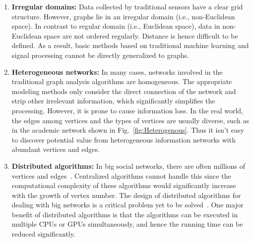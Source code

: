 \begin{enumerate}
  \item \textbf{Irregular domains:} Data collected by traditional sensors have a clear grid structure. However, graphs lie in an irregular domain (i.e., non-Euclidean space). In contrast to regular domain (i.e., Euclidean space), data in non-Euclidean space are not ordered regularly. Distance is hence difficult to be defined. As a result, basic methods based on traditional machine learning and signal processing cannot be directly generalized to graphs.
  \item \textbf{Heterogeneous networks:} In many cases, networks involved in the traditional graph analysis algorithms are homogeneous. The appropriate modeling methods only consider the direct connection of the network and strip other irrelevant information, which significantly simplifies the processing. However, it is prone to cause information loss. In the real world, the edges among vertices and the types of vertices are usually diverse, such as in the academic network shown in Fig.~\ref{fig:Heterogenous}. Thus it isn't easy to discover potential value from heterogeneous information networks with abundant vertices and edges.
  \item \textbf{Distributed algorithms:} In big social networks, there are often millions of vertices and edges~. Centralized algorithms cannot handle this since the computational complexity of these algorithms would significantly increase with the growth of vertex number. The design of distributed algorithms for dealing with big networks is a critical problem yet to be solved~. One major benefit of distributed algorithms is that the algorithms can be executed in multiple CPUs or GPUs simultaneously, and hence the running time can be reduced significantly.
\end{enumerate}

